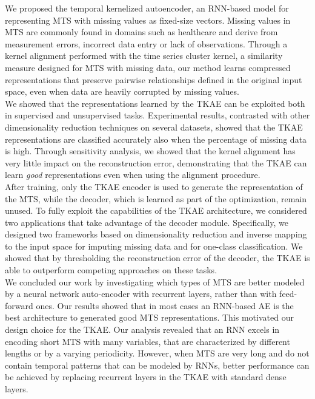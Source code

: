 \documentclass[a4paper,10pt,pdftex]{article}
\begin{document}
We proposed the temporal kernelized autoencoder, an RNN-based model for representing MTS with missing values as fixed-size vectors. 
Missing values in MTS are commonly found in domains such as healthcare and derive from measurement errors, incorrect data entry or lack of observations.
Through a kernel alignment performed with the time series cluster kernel, a similarity measure designed for MTS with missing data, our method learns compressed representations that preserve pairwise relationships defined in the original input space, even when data are heavily corrupted by missing values.\\
We showed that the representations learned by the TKAE can be exploited both in supervised and unsupervised tasks.
Experimental results, contrasted with other dimensionality reduction techniques on several datasets, showed that the TKAE representations are classified accurately also when the percentage of missing data is high.
Through sensitivity analysis, we showed that the kernel alignment has very little impact on the reconstruction error, demonstrating that the TKAE can learn \textit{good} representations even when using the alignment procedure.\\
After training, only the TKAE encoder is used to generate the representation of the MTS, while the decoder, which is learned as part of the optimization, remain unused.
To fully exploit the capabilities of the TKAE architecture, we considered two applications that take advantage of the decoder module. 
Specifically, we designed two frameworks based on dimensionality reduction and inverse mapping to the input space for imputing missing data and for one-class classification.
We showed that by thresholding the reconstruction error of the decoder, the TKAE is able to outperform competing approaches on these tasks.\\
We concluded our work by investigating which types of MTS are better modeled by a neural network auto-encoder with recurrent layers, rather than with feed-forward ones.
Our results showed that in most cases an RNN-based AE is the best architecture to generated good MTS representations. This motivated our design choice for the TKAE.
Our analysis revealed that an RNN excels in encoding short MTS with many variables, that are characterized by different lengths or by a varying periodicity.
However, when MTS are very long and do not contain temporal patterns that can be modeled by RNNs, better performance can be achieved by replacing recurrent layers in the TKAE with standard dense layers.
\end{document}
